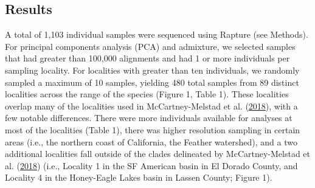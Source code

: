 \documentclass[proquest,12pt,final]{ucthesis-CA2012} %
\begin{document}
\begin{ucmainmatter}
\hypertarget{results-2}{%
\section{Results}\label{results-2}}

A total of 1,103 individual samples were sequenced using Rapture (see
Methods). For principal components analysis (PCA) and admixture, we
selected samples that had greater than 100,000 alignments and had 1 or
more individuals per sampling locality. For localities with greater than
ten individuals, we randomly sampled a maximum of 10 samples, yielding
480 total samples from 89 distinct localities across the range of the
species (Figure 1, Table 1). These localities overlap many of the
localities used in McCartney-Melstad et al.
(\protect\hyperlink{ref-mccartney-melstad_population_2018}{2018}), with
a few notable differences. There were more individuals available for
analyses at most of the localities (Table 1), there was higher
resolution sampling in certain areas (i.e., the northern coast of
California, the Feather watershed), and a two additional localities fall
outside of the clades delineated by McCartney-Melstad et al.
(\protect\hyperlink{ref-mccartney-melstad_population_2018}{2018}) (i.e.,
Locality 1 in the SF American basin in El Dorado County, and Locality 4
in the Honey-Eagle Lakes basin in Lassen County; Figure 1).










\end{ucmainmatter}
\end{document}
